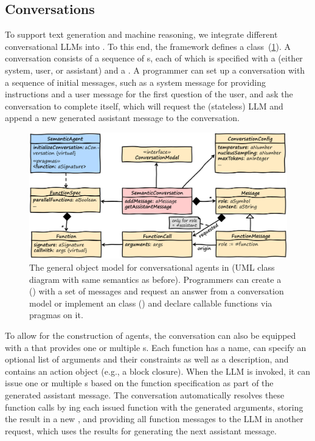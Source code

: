 \FloatBarrier

\subsection*{Conversations}
\label{sec:semtex/model/conversations}

To support text generation and machine reasoning, we integrate different conversational LLMs into \semtex.
To this end, the framework defines a  class~(\cref{fig:semtex/model/conversation}).
A conversation consists of a sequence of s, each of which is specified with a  (either system, user, or assistant) and a .
A programmer can set up a conversation with a sequence of initial messages, such as a system message for providing instructions and a user message for the first question of the user, and ask the conversation to complete itself, which will request the (stateless) LLM and append a new generated assistant message to the conversation.

\begin{figure}
	\centering
	\includegraphics[width=\textwidth]{01_model/conversation.png}
	\caption[The object model for conversational agents in \semtex.]{
		The general object model for conversational agents in \semtex (UML class diagram with same semantics as before).
		Programmers can create a  (\bold{\textcolor[HTML]{c00000}{red}}) with a set of messages and request an answer from a conversation model or implement an  class (\bold{\textcolor[HTML]{004080}{blue}}) and declare callable functions via pragmas on it.
	}
	\label{fig:semtex/model/conversation}
\end{figure}

To allow for the construction of agents, the conversation can also be equipped with a  that provides one or multiple s.
Each function has a name, can specify an optional list of arguments and their constraints as well as a description, and contains an action object (e.g., a block closure).
When the LLM is invoked, it can issue one or multiple s based on the function specification as part of the generated assistant message.
The conversation automatically resolves these function calls by ing each issued function with the generated arguments, storing the result in a new , and providing all function messages to the LLM in another request, which uses the results for generating the next assistant message.

